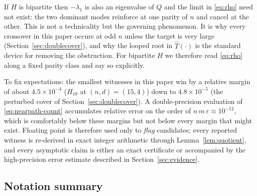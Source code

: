 \begin{remark}
  \label{rem:bipartite-parity}
  If $H$ is bipartite then $-\lambda_1$ is also an eigenvalue of $Q$ and
  the limit in \eqref{eq:rho} need not exist: the two dominant modes
  reinforce at one parity of $n$ and cancel at the other. This is not a
  technicality but the governing phenomenon. It is why every crossover
  in this paper occurs at odd $n$ unless the target is very large
  (Section~\ref{sec:doublecover}), and why the looped root in
  $\hat T(\cdot)$ is the standard device for removing the obstruction.
  For bipartite $H$ we therefore read \eqref{eq:rho} along a fixed
  parity class and say so explicitly.
\end{remark}

\begin{remark}
  \label{rem:margins}
  To fix expectations: the smallest witnesses in this paper win by a
  relative margin of about $4.5 \times 10^{-4}$ ($H_{18}$ at $(n,d)=(15,4)$)
  down to $4.8 \times 10^{-5}$ (the perturbed cover of
  Section~\ref{sec:doublecover}). A double-precision evaluation of
  \eqref{eq:nearpath-count} accumulates relative error on the order of
  $n\,m\,\varepsilon \approx 10^{-12}$, which is comfortably below these
  margins but not below every margin that might exist. Floating point is
  therefore used only to \emph{flag} candidates; every reported witness
  is re-derived in exact integer arithmetic through
  Lemma~\ref{lem:quotient}, and every asymptotic claim is either an exact
  certificate or accompanied by the high-precision error estimate
  described in Section~\ref{sec:evidence}.
\end{remark}

\subsection{Notation summary}

